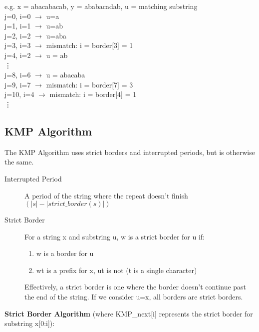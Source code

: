 e.g.
x = abacabacab, y = ababacadab, u = matching substring \\
j=0, i=0 $\rightarrow$ u=a \\
j=1, i=1 $\rightarrow$ u=ab \\
j=2, i=2 $\rightarrow$ u=aba \\
j=3, i=3 $\rightarrow$ mismatch: i = border[3] = 1 \\
j=4, i=2 $\rightarrow$ u = ab \\
\vdots \\
j=8, i=6 $\rightarrow$ u = abacaba \\
j=9, i=7  $\rightarrow$ mismatch: i = border[7] = 3 \\
j=10, i=4 $\rightarrow$ mismatch: i = border[4] = 1 \\
\vdots

\subsection{KMP Algorithm}
The KMP Algorithm uses strict borders and interrupted periods, but is otherwise the same. 
\begin{description}
    \item[Interrupted Period] A period of the string where the repeat doesn't finish $(|s| - |strict\_border(s)|)$
    \item[Strict Border] For a string x and substring u, w is a strict border for u if:
    \begin{enumerate}
        \item w is a border for u
        \item wt is a prefix for x, ut is not (t is a single character)
    \end{enumerate}
    Effectively, a strict border is one where the border doesn't continue past the end of the string. If we consider u=x, all borders are strict borders. 
\end{description}
\textbf{Strict Border Algorithm} (where KMP\_next[i] represents the strict border for substring x[0:i]):
